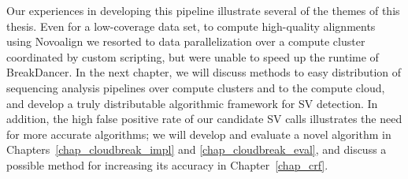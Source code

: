 Our experiences in developing this pipeline illustrate several of the themes of this thesis. Even for a low-coverage data set, to compute high-quality alignments using Novoalign we resorted to data parallelization over a compute cluster coordinated by custom scripting, but were unable to speed up the runtime of BreakDancer. In the next chapter, we will discuss methods to easy distribution of sequencing analysis pipelines over compute clusters and to the compute cloud, and develop a truly distributable algorithmic framework for SV detection. In addition, the high false positive rate of our candidate SV calls illustrates the need for more accurate algorithms; we will develop and evaluate a novel algorithm in Chapters~\ref{chap_cloudbreak_impl} and \ref{chap_cloudbreak_eval}, and discuss a possible method for increasing its accuracy in Chapter~\ref{chap_crf}.